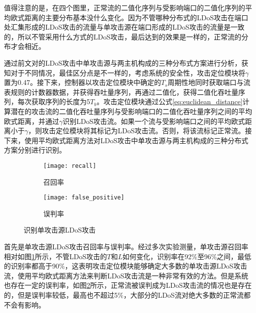 值得注意的是，在四个图里，正常流的二值化序列与受影响端口的二值化序列的平均欧式距离的主要分布基本没什么变化。因为不管哪种分布式的LDoS攻击在端口处汇集形成的LDoS攻击的流量与单攻击源在端口形成的LDoS攻击的流量是一致的，所以不管采用什么方式的LDoS攻击，最后达到的效果是一样的，正常流的分布才会相近。

通过前文对的LDoS攻击中单攻击源与两主机构成的三种分布式方案进行分析，获知对于不同情况，最佳区分点是不一样的，考虑系统的安全性，攻击定位模块将$\gamma$置为0.47。接下来，控制器以攻击定位模块中确定的$T_s$周期性地同时获取端口与流表规则的计数器数据，并获得吞吐量序列，再通过二值化，获得二值化吞吐量序列，每次获取序列的长度为5$T_b$。攻击定位模块通过公式\ref{eq:euclidean_distance}计算潜在的攻击流的二值化吞吐量序列与受影响端口的二值化吞吐量序列之间的平均欧式距离，并通过$\gamma$识别LDoS攻击流。如果一个流与受影响端口之间的平均欧式距离小于$\gamma$，则攻击定位模块将其标记为LDoS攻击流。否则，将该流标记正常流。接下来，使用平均欧式距离方法对LDoS攻击中单攻击源与两主机构成的三种分布式方案分别进行识别。


\begin{figure}
    \begin{subfigure}{.49\textwidth}
        \centering
        \texttt{[image: recall]}
        \caption{召回率}
        \label{fig:recall}
    \end{subfigure}
    \begin{subfigure}{.49\textwidth}
        \centering
        \texttt{[image: false\_positive]}
        \caption{误判率}
        \label{fig:false-positive}
    \end{subfigure}
    \caption{识别单攻击源LDoS攻击}
    \label{fig:accuracy-single}
\end{figure}

首先是单攻击源LDoS攻击召回率与误判率。经过多次实验测量，单攻击源召回率相对如图\ref{fig:recall}所示，不管LDoS攻击的$T$和$L$如何变化，识别率在92\%至96\%之间，最低的识别率都高于90\%，这表明攻击定位模块能够确定大多数的单攻击源LDoS攻击流，使用平均欧式距离方法来判断LDoS攻击流是一种非常有效的方法。但是系统也存在一定的误判率，如图\ref{fig:false-positive}所示，正常流被误判成为LDoS攻击流的情况也是存在的，但是误判率较低，最高也不超过5\%，大部分的LDoS流对绝大多数的正常流都不会有影响。


